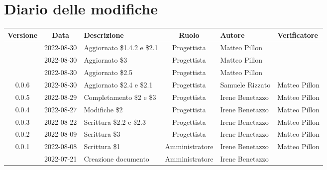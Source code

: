 \section*{Diario delle modifiche}
	\begin{center}
	\renewcommand{\arraystretch}{1.8} %
	\begin{longtable}{ |c|c|p{8em}|c|m{5em}|m{6em}| }
	\hline
	\textbf{Versione} & \textbf{Data} & \textbf{Descrizione} &  \textbf{Ruolo} &  \textbf{Autore} & \textbf{Verificatore}\\ %
	\hline %
	& 2022-08-30 & Aggiornato \$1.4.2 e \$2.1 & Progettista & Matteo \newline Pillon & \\ 
	\hline
	& 2022-08-30 & Aggiornato \$3 & Progettista & Matteo \newline Pillon & \\ 
	\hline
	& 2022-08-30 & Aggiornato \$2.5 & Progettista & Matteo \newline Pillon & \\ 
	\hline
	0.0.6& 2022-08-30 & Aggiornato \$2.4 e \$2.1 & Progettista & Samuele \newline Rizzato & Matteo Pillon \\ 
	\hline
	0.0.5& 2022-08-29 & Completamento \$2 e \$3 & Progettista & Irene \newline Benetazzo & Matteo \newline Pillon\\ 
	\hline
	0.0.4& 2022-08-27 & Modifiche \$2 & Progettista & Irene \newline Benetazzo & Matteo \newline Pillon \\ 
	\hline
	0.0.3& 2022-08-22 & Scrittura \$2.2 e \$2.3 & Progettista & Irene \newline Benetazzo & Matteo Pillon\\ 
	\hline
    0.0.2& 2022-08-09 & Scrittura \$3 & Progettista & Irene \newline Benetazzo & Matteo \newline Pillon \\ 
	\hline
	0.0.1& 2022-08-08 & Scrittura \$1 & Amministratore & Irene \newline Benetazzo & Matteo Pillon\\ 
	\hline
	& 2022-07-21 & Creazione documento & Amministratore & Irene \newline Benetazzo & \\ 
	\hline
	\end{longtable}
	\end{center}
	\newpage